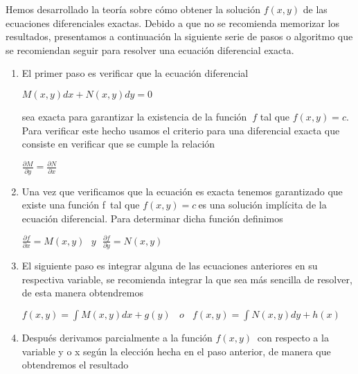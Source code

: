 \documentclass[l etterpaper,11pt]{article}
\begin{document}
Hemos desarrollado la teoría sobre cómo obtener la solución $ f(x,y) $ de las ecuaciones diferenciales exactas. Debido a que no se recomienda memorizar los resultados, presentamos a continuación la siguiente serie de pasos o algoritmo que se recomiendan seguir para resolver una ecuación diferencial exacta.

\begin{enumerate}
\item  El primer paso es verificar que la ecuación diferencial
\begin{center}
$M(x,y)dx+N(x,y)dy=0$\\
\end{center}

sea exacta para garantizar la existencia de la función $\ f  $ tal que $ f(x,y)=c. $ Para verificar este hecho usamos el criterio para una diferencial exacta que consiste en verificar que se cumple la relación
\begin{center}

$\frac{\partial M}{\partial y}=\frac{\partial N}{\partial x}$\\
\end{center}

\item  Una vez que verificamos que la ecuación es exacta tenemos garantizado que existe una función f\ tal que $f(x,y)=c\ $es una solución implícita de la ecuación diferencial. Para determinar dicha función definimos
\begin{center}

$\frac{\partial f}{\partial x}=M(x,y)\ \ \ y\ \ \ \frac{\partial f}{\partial y}=N(x,y)$\\
\end{center}

\item  El siguiente paso es integrar alguna de las ecuaciones anteriores en su respectiva variable, se recomienda integrar la que sea más sencilla de resolver, de esta manera obtendremos
\begin{center}

$f(x,y)=\int M(x,y)dx+g(y)\ \ \ \ o\ \ \ \ f(x,y)=\int N(x,y)dy+h(x)$\\

\end{center}

\item  Después derivamos parcialmente a la función $ f(x,y)\ $ con respecto a la variable y o x según la elección hecha en el paso anterior, de manera que obtendremos el resultado
\begin{center}


\end{center}
\end{enumerate}
\end{document}
